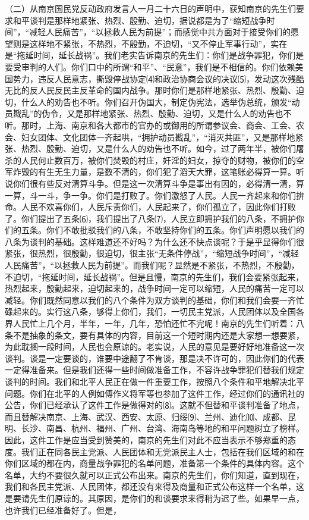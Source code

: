 \documentclass[UTF-8, a5paper, 12pt]{ctexart}
\begin{document}
（二）从南京国民党反动政府发言人一月二十六日的声明中，获知南京的先生们要求和平谈判是那样地紧张、热烈、殷勤、迫切，据说都是为了“缩短战争时间”，“减轻人民痛苦”，“以拯救人民为前提”；而感觉中共方面对于接受你们的愿望则是这样地不紧张，不热烈，不殷勤，不迫切，“又不停止军事行动”，实在是“拖延时间，延长战祸”。我们老实告诉南京的先生们：你们是战争罪犯，你们是要受审判的人们。你们口中的所谓“和平”、“民意”，我们是不相信的。你们依赖美国势力，违反人民意志，撕毁停战协定⑷和政治协商会议的决议⑸，发动这次残酷无比的反人民反民主反革命的国内战争。那时你们是那样地紧张、热烈、殷勤、迫切，什么人的劝告也不听。你们召开伪国大，制定伪宪法，选举伪总统，颁发“动员戡乱”的伪令，又是那样地紧张、热烈、殷勤、迫切，又是什么人的劝告也不听。那时，上海、南京和各大都市的官办的或御用的所谓参议会、商会、工会、农会、妇女团体、文化团体一齐起哄，“拥护动员戡乱”，“消灭共匪”，又是那样地紧张、热烈、殷勤、迫切，又是什么人的劝告也不听。如今，过了两年半，被你们屠杀的人民何止数百万，被你们焚毁的村庄，奸淫的妇女，掠夺的财物，被你们的空军炸毁的有生无生力量，是数不清的，你们犯了滔天大罪，这笔账必得算一算。听说你们很有些反对清算斗争。但是这一次清算斗争是事出有因的，必得清一清，算一算，斗一斗，争一争。你们是打败了。你们激怒了人民。人民一齐起来和你们拚命。人民不欢喜你们，人民斥责你们，人民起来了，你们孤立了，因此你们打败了。你们提出了五条⑹，我们提出了八条⑺，人民立即拥护我们的八条，不拥护你们的五条。你们不敢批驳我们的八条，不敢坚持你们的五条。你们声明愿以我们的八条为谈判的基础。这样难道还不好吗？为什么还不快点谈呢？于是乎显得你们很紧张，很热烈，很殷勤，很迫切，很主张“无条件停战”，“缩短战争时间”，“减轻人民痛苦”，“以拯救人民为前提”。而我们呢？显然是不紧张，不热烈，不殷勤，不迫切，“拖延时间，延长战祸”。但是且慢，南京的先生们，我们会要紧张起来，热烈起来，殷勤起来，迫切起来的，战争时间一定可以缩短，人民的痛苦一定可以减轻。你们既然同意以我们的八个条件为双方谈判的基础，你们和我们会要一齐忙碌起来的。实行这八条，够得上你们，我们，一切民主党派，人民团体以及全国各界人民忙上几个月，半年，一年，几年，恐怕还忙不完呢！南京的先生们听着：八条不是抽象的条文，要有具体的内容，目前这一个短时期内还是大家想一想要紧，为此耽搁一段时间，人民也会原谅的。老实说，人民的意见是要好好地准备这一次谈判。谈是一定要谈的，谁要中途翻了不肯谈，那是决不许可的，因此你们的代表一定得准备来。但是我们还得一些时间做准备工作，不容许战争罪犯们替我们规定谈判的时间。我们和北平人民正在做一件重要工作，按照八个条件和平地解决北平问题。你们在北平的人例如傅作义将军等也参加了这件工作，经过你们的通讯社的公告，你们已经承认了这件工作是做得对的⑻。这就不但替和平谈判准备了地点，而且替解决南京、上海、武汉、西安、太原、归绥⑼、兰州、迪化⑽、成都、昆明、长沙、南昌、杭州、福州、广州、台湾、海南岛等地的和平问题树立了榜样。因此，这件工作是应当受到赞美的，南京的先生们对此不应当表示不够郑重的态度。我们正在同各民主党派、人民团体和无党派民主人士，包括在我们区域的和在你们区域的都在内，商量战争罪犯的名单问题，准备第一个条件的具体内容。这个名单，大约不要很久就可以正式公布出来。南京的先生们，你们知道，直到现在，我们和各民主党派、人民团体，都还没有来得及商量和正式公布这样一个名单，这是要请先生们原谅的。其原因，是你们的和谈要求来得稍为迟了些。如果早一点，也许我们已经准备好了。但是，
\end{document}
